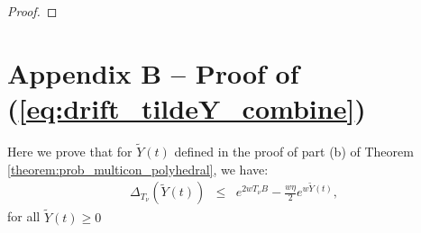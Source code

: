\documentclass[journal]{IEEEtran}
\newcommand{\expect}[1]{\mathbb{E}\big\{#1\big\}}
\newcommand{\bv}[1]{{\boldsymbol{#1} }}
\begin{document}
\begin{proof}
%
\end{proof}


\section*{Appendix B -- Proof of (\ref{eq:drift_tildeY_combine})  }
Here we prove that for $\tilde{Y}(t)$ defined in the proof of part (b) of Theorem \ref{theorem:prob_multicon_polyhedral}, we have:
\begin{eqnarray*}
\Delta_{T_{\nu}}(\tilde{Y}(t)) &\leq&e^{2wT_{\nu}B}-\frac{w\eta}{2}e^{w\tilde{Y}(t)},
\end{eqnarray*}
for all $\tilde{Y}(t)\geq0$
\end{document}
